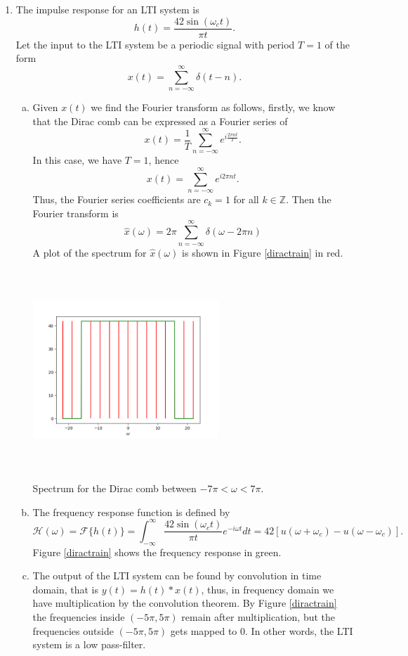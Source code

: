 \newpage

\begin{enumerate}
\item The impulse response for an LTI system is 
$$h(t)=\frac{42\sin(\omega_{c}t)}{\pi t}.$$
Let the input to the LTI system be a periodic signal with period $T=1$ of the form
$$x(t)=\sum_{n=-\infty}^{\infty}\delta(t-n).$$

\begin{enumerate}[a)]
\item Given $x(t)$ we find the Fourier transform as follows, firstly, we know that the Dirac comb can be expressed as a Fourier series of 
$$x(t)=\frac{1}{T}\sum_{n=-\infty}^{\infty}e^{i\frac{2\pi nt}{T}}.$$
In this case, we have $T=1$, hence
$$x(t)=\sum_{n=-\infty}^{\infty}e^{i2\pi nt}.$$
Thus, the Fourier series coefficients are $c_{k}=1$ for all $k\in\mathbb{Z}$. Then the Fourier transform is
$$\hat{x}(\omega)=2\pi\sum_{n=-\infty}^{\infty}\delta(\omega-2\pi n)$$
A plot of the spectrum for $\hat{x}(\omega)$ is shown in Figure \ref{diractrain} in red.

\begin{marginfigure}[1cm]
    \includegraphics[height=7.5cm,width=7.0cm]{ch10/figures/diractrain.png}
    \caption{Spectrum for the Dirac comb between $-7\pi<\omega<7\pi$.}
    \label{diractrain}
\end{marginfigure}

\item The frequency response function is defined by
$$\mathcal{H}(\omega)=\mathcal{F}\{h(t)\}=\int_{-\infty}^{\infty}\frac{42\sin(\omega_{c}t)}{\pi t}e^{-i\omega t}dt=42[u(\omega+\omega_{c})-u(\omega-\omega_{c})].$$
Figure \ref{diractrain} shows the frequency response in green.


\item The output of the LTI system can be found by convolution in time domain, that is $y(t)=h(t)*x(t)$, thus, in frequency domain we have multiplication by the convolution theorem. By Figure \ref{diractrain} the frequencies inside $(-5\pi,5\pi)$ remain after multiplication, but the frequencies outside $(-5\pi,5\pi)$ gets mapped to $0$. In other words, the LTI system is a low pass-filter. 


\end{enumerate}
\end{enumerate}
